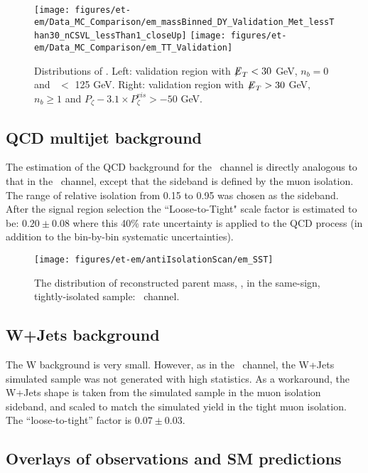 \begin{figure}\centering
  \texttt{[image: figures/et-em/Data\_MC\_Comparison/em\_massBinned\_DY\_Validation\_Met\_lessThan30\_nCSVL\_lessThan1\_closeUp]}
  \texttt{[image: figures/et-em/Data\_MC\_Comparison/em\_TT\_Validation]}
  \caption{\label{fig:em_dy_tt} Distributions of \meffemu. Left:
    validation region with ${\not\mathrel{E}}_T<30$ GeV, $n_b = 0$ and \meffemu ~$<$ 125 GeV.  Right:
    validation region with ${\not\mathrel{E}}_T>30$ GeV, $n_b\geq1$ and $P_{\zeta}- 3.1 \times P_{\zeta}^{vis} > -50$ GeV.}
\end{figure}




\subsection{QCD multijet background}\label{sec:em_qcd}
The estimation of the QCD background for the \tetm ~channel is directly
analogous to that in the \teth ~channel, except that the sideband is
defined by the muon isolation. The range of relative
isolation from 0.15 to 0.95 was chosen as the sideband. After the
signal region selection the ``Loose-to-Tight" scale factor is estimated
to be: $0.20 \pm 0.08$ where this 40\% rate uncertainty is applied to
the QCD process (in addition to the bin-by-bin systematic
uncertainties). 

\begin{figure}[thbp!]\centering
  \texttt{[image: figures/et-em/antiIsolationScan/em\_SST]}
  \caption{\label{fig:em_sst} The distribution of reconstructed parent
    mass, \meffemu , in the same-sign, tightly-isolated sample: \tetm
    ~channel.}
\end{figure}

\subsection{W+Jets background}
\label{sec:em_w_bkg_validation}
The W background is very small.  However, as in the \teth ~channel, the
W+Jets simulated sample was not generated with high statistics.  As a
workaround, the W+Jets shape is taken from the simulated sample in the
muon isolation sideband, and scaled to match the simulated yield in
the tight muon isolation.  The ``loose-to-tight'' factor is
$0.07\pm0.03$.

\subsection{Overlays of observations and SM predictions}
\label{sec:em_overlays}

